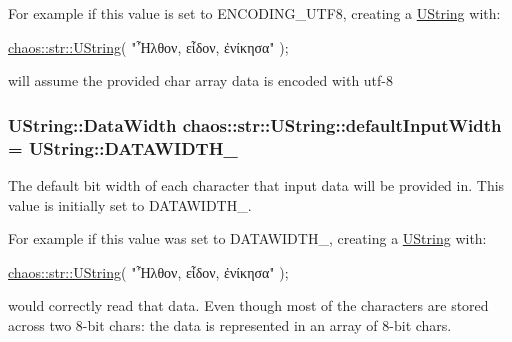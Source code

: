 For example if this value is set to E\-N\-C\-O\-D\-I\-N\-G\-\_\-\-U\-T\-F8, creating a \hyperlink{classchaos_1_1str_1_1_u_string}{U\-String} with\-: 
\begin{DoxyCode}
\hyperlink{classchaos_1_1str_1_1_u_string}{chaos::str::UString}( \textcolor{stringliteral}{"Ἦλθον, εἶδον, ἐνίκησα"} );
\end{DoxyCode}
 will assume the provided char array data is encoded with utf-\/8 \hypertarget{classchaos_1_1str_1_1_u_string_af2df9ef0080748c1ca4802fd8285d5bc}{
\subsubsection[{default\-Input\-Width}]{\setlength{\rightskip}{0pt plus 5cm}U\-String\-::\-Data\-Width chaos\-::str\-::\-U\-String\-::default\-Input\-Width = U\-String\-::\-D\-A\-T\-A\-W\-I\-D\-T\-H\-\_\hspace{0.3cm}{\ttfamily [static]}}}\label{classchaos_1_1str_1_1_u_string_af2df9ef0080748c1ca4802fd8285d5bc}
The default bit width of each character that input data will be provided in. This value is initially set to D\-A\-T\-A\-W\-I\-D\-T\-H\-\_.

For example if this value was set to D\-A\-T\-A\-W\-I\-D\-T\-H\-\_, creating a \hyperlink{classchaos_1_1str_1_1_u_string}{U\-String} with\-: 
\begin{DoxyCode}
\hyperlink{classchaos_1_1str_1_1_u_string}{chaos::str::UString}( \textcolor{stringliteral}{"Ἦλθον, εἶδον, ἐνίκησα"} );
\end{DoxyCode}
 would correctly read that data. Even though most of the characters are stored across two 8-\/bit chars\-: the data is represented in an array of 8-\/bit chars.

